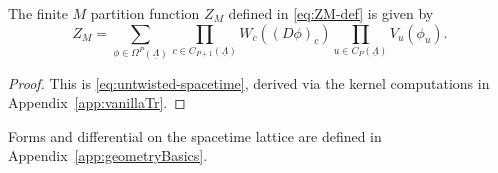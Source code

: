 \begin{prop} The finite $M$ partition function $Z_M$ defined in \eqref{eq:ZM-def} is given by
	\begin{equation}
		Z_M
		=
		\sum_{\phi\in\Omega^P(\underline\Lambda)}
		\prod_{c\in C_{P+1}(\underline\Lambda)}
		W_c\left((D\phi)_c\right)
		\prod_{u\in C_P(\underline\Lambda)}
		V_u(\phi_u).
		\label{eq:Z-0}
	\end{equation}
\end{prop}
\begin{proof}
	This is \eqref{eq:untwisted-spacetime}, derived via the kernel computations in Appendix~\ref{app:vanillaTr}.
\end{proof}
Forms and differential on the spacetime lattice are defined in Appendix~\ref{app:geometryBasics}.

